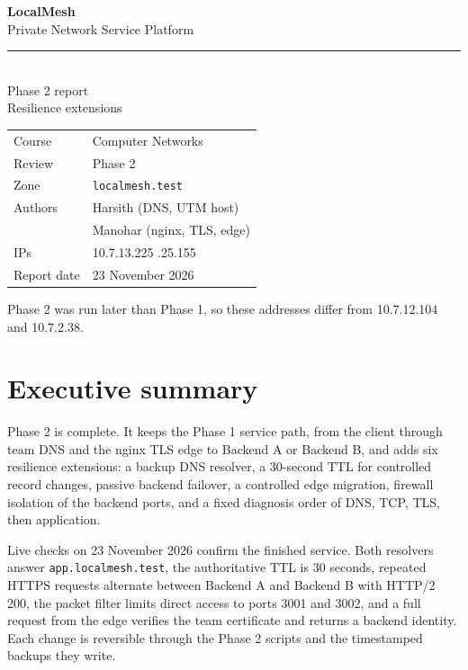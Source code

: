 \documentclass[11pt,a4paper]{article}
\begin{document}
\begin{titlepage}
\pagecolor{lmNavy}
\color{white}
\vspace*{1.6cm}
{\Huge\bfseries LocalMesh}\\[8pt]
{\LARGE Private Network Service Platform}\\[18pt]
{\color{lmTeal}\rule{4.2cm}{2.4pt}}\\[16pt]
{\Large Phase 2 report}\\[6pt]
{\large Resilience extensions}\\[2.4cm]
\begin{tabular}{@{}ll}
  \color{lmTeal} Course & \color{white} Computer Networks \\[4pt]
  \color{lmTeal} Review & \color{white} Phase 2 \\[4pt]
  \color{lmTeal} Zone & \color{white} \texttt{localmesh.test} \\[4pt]
  \color{lmTeal} Authors & \color{white} Harsith (DNS, UTM host) \\
                         & \color{white} Manohar (nginx, TLS, edge) \\[4pt]
  \color{lmTeal} IPs & \color{white} 10.7.13.225 \quad 10.7.25.155 \\[4pt]
  \color{lmTeal} Report date & \color{white} 23 November 2026 \\
\end{tabular}
\vfill
{\small Phase 2 was run later than Phase 1, so these addresses differ from 10.7.12.104 and 10.7.2.38.}
\end{titlepage}
\nopagecolor
\color{black}

\tableofcontents
\newpage

\section{Executive summary}
Phase 2 is complete. It keeps the Phase 1 service path, from the client through
team DNS and the nginx TLS edge to Backend A or Backend B, and adds six
resilience extensions: a backup DNS resolver, a 30-second TTL for controlled record
changes, passive backend failover, a controlled edge migration, firewall isolation of
the backend ports, and a fixed diagnosis order of DNS, TCP, TLS, then application.

Live checks on 23 November 2026 confirm the finished service. Both resolvers answer
\texttt{app.localmesh.test}, the authoritative TTL is 30 seconds, repeated HTTPS
requests alternate between Backend A and Backend B with HTTP/2 200, the packet filter
limits direct access to ports 3001 and 3002, and a full request from the edge verifies
the team certificate and returns a backend identity. Each change is reversible through
the Phase 2 scripts and the timestamped backups they write.
\end{document}
